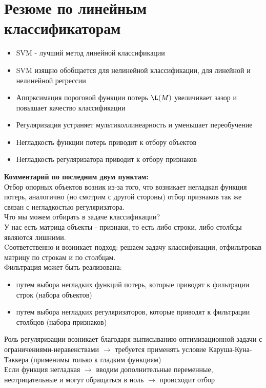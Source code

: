 \section{Резюме по линейным классификаторам}
\begin{itemize}
    \item SVM - лучший метод линейной классификации
    \item SVM изящно обобщается для нелинейной классификации, для линейной и нелинейной регрессии
    \item Аппрксимация пороговой функции потерь $\L (M)$ увеличивает зазор и повышает качество классификации
    \item Регуляризация устраняет мультиколлинеарность и уменьшает переобучение
    \item Негладкость функции потерь приводит к отбору объектов
    \item Негладкость регуляризатора приводит к отбору признаков
\end{itemize}
\textbf{Комментарий по последним двум пунктам:} \\
Отбор опорных объектов возник из-за того, что возникает негладкая функция потерь, аналогично (но смотрим с другой стороны)  отбор признаков так же связан с негладкостью регуляризатора. \\
Что мы можем отбирать в задаче классификации? \\
У нас есть матрица объекты - признаки, то есть либо строки, либо столбцы являются лишними.\\ Cоответственно и возникает подход: решаем задачу классификации, отфильтровав матрицу по строкам и по столбцам. \\
Фильтрация может быть реализована:
\begin{itemize}
    \item путем выбора негладких функций потерь, которые приводят к фильтрации строк (набора объектов)
    \item путем выбора негладких регуляризаторов, которые приводят к фильтрации столбцов (набора признаков)
\end{itemize}
Роль регуляризации возникает благодаря выписыванию оптимизационной задачи с ограничениями-неравенствами $\rightarrow$ требуется применять условие Каруша-Куна-Таккера (применимы только к гладким функциям) \\ 
Если функция негладкая $\rightarrow$ вводим дополнительные переменные, неотрицательные и могут обращаться в ноль $\rightarrow$ происходит отбор \\


